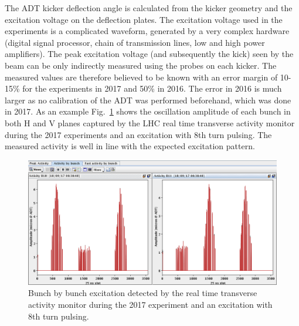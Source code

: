 \documentclass[%
 reprint,
 amsmath,amssymb,
 aps,
prstab,
]{revtex4-1}
\begin{document}
The ADT kicker deflection angle is calculated from the kicker geometry and the excitation voltage on the deflection plates. The excitation voltage used in the experiments is a complicated waveform, generated by a very complex hardware (digital signal processor, chain of transmission lines, low and high power amplifiers). The peak excitation voltage (and subsequently the kick) seen by the beam can be only indirectly measured using the probes on each kicker. The measured values are therefore believed to be known with an error margin of 10-15\% for the experiments in 2017 and 50\% in 2016. The error in 2016 is much larger as no calibration of the ADT was performed beforehand, which was done in 2017. As an example Fig.~\ref{fig:fill_meas} shows the oscillation amplitude of each bunch in both H and V planes captured by the LHC real time transverse activity monitor during the 2017 experiments and an excitation with 8th turn pulsing. The measured activity is well in line with the expected excitation pattern.
\begin{figure}[h]
	\centering
	\includegraphics[width=1.0\linewidth]{bunchfilling_measured.png}	
	\caption{\label{fig:fill_meas} Bunch by bunch excitation detected by the real time transverse activity monitor during the 2017 experiment and an excitation with 8th turn pulsing.}
\end{figure}
\end{document}
